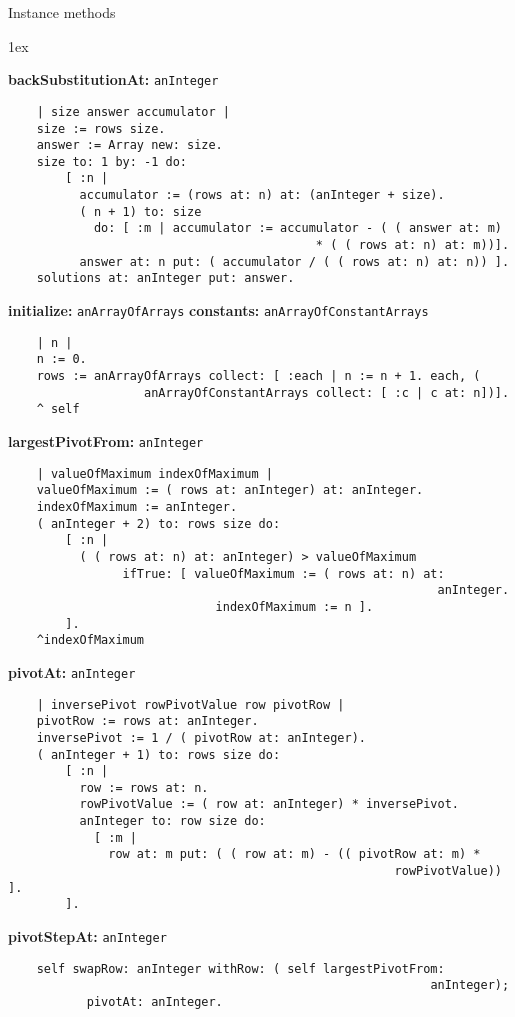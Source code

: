 Instance methods
{\parskip 1ex\par\noindent}
{\bf backSubstitutionAt:} {\tt anInteger}
\begin{verbatim}
    | size answer accumulator |
    size := rows size.
    answer := Array new: size.
    size to: 1 by: -1 do:
        [ :n |
          accumulator := (rows at: n) at: (anInteger + size).
          ( n + 1) to: size
            do: [ :m | accumulator := accumulator - ( ( answer at: m) 
                                           * ( ( rows at: n) at: m))].
          answer at: n put: ( accumulator / ( ( rows at: n) at: n)) ].
    solutions at: anInteger put: answer.
\end{verbatim}
{\bf initialize:} {\tt anArrayOfArrays} {\bf constants:} {\tt anArrayOfConstantArrays}
\begin{verbatim}
    | n |
    n := 0.
    rows := anArrayOfArrays collect: [ :each | n := n + 1. each, ( 
                   anArrayOfConstantArrays collect: [ :c | c at: n])].
    ^ self
\end{verbatim}
{\bf largestPivotFrom:} {\tt anInteger}
\begin{verbatim}
    | valueOfMaximum indexOfMaximum |
    valueOfMaximum := ( rows at: anInteger) at: anInteger.
    indexOfMaximum := anInteger.
    ( anInteger + 2) to: rows size do:
        [ :n |
          ( ( rows at: n) at: anInteger) > valueOfMaximum
                ifTrue: [ valueOfMaximum := ( rows at: n) at: 
                                                            anInteger.
                             indexOfMaximum := n ].
        ].
    ^indexOfMaximum 
\end{verbatim}
{\bf pivotAt:} {\tt anInteger}
\begin{verbatim}
    | inversePivot rowPivotValue row pivotRow |
    pivotRow := rows at: anInteger.
    inversePivot := 1 / ( pivotRow at: anInteger).
    ( anInteger + 1) to: rows size do:
        [ :n |
          row := rows at: n.
          rowPivotValue := ( row at: anInteger) * inversePivot.
          anInteger to: row size do:
            [ :m |
              row at: m put: ( ( row at: m) - (( pivotRow at: m) * 
                                                      rowPivotValue)) ].
        ].
\end{verbatim}
{\bf pivotStepAt:} {\tt anInteger}
\begin{verbatim}
    self swapRow: anInteger withRow: ( self largestPivotFrom: 
                                                           anInteger);
           pivotAt: anInteger.
\end{verbatim}
